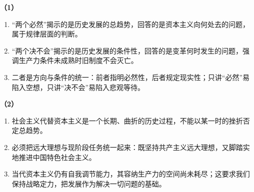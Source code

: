 \textbf{（1）}
\begin{enumerate}[label=(\arabic*),leftmargin=2.2em,itemsep=2pt,topsep=2pt]
\item “两个必然”揭示的是历史发展的总趋势，回答的是资本主义向何处去的问题，属于规律层面的判断。
\item “两个决不会”揭示的是历史发展的条件性，回答的是变革何时发生的问题，强调生产力条件未成熟时旧制度不会灭亡。
\item 二者是方向与条件的统一：前者指明必然性，后者规定现实性；只讲“必然”易陷入空想，只讲“决不会”易陷入悲观等待。
\end{enumerate}

\textbf{（2）}
\begin{enumerate}[label=(\arabic*),leftmargin=2.2em,itemsep=2pt,topsep=2pt]
\item 社会主义代替资本主义是一个长期、曲折的历史过程，不能以某一时的挫折否定总趋势。
\item 必须把远大理想与现阶段任务统一起来：既坚持共产主义远大理想，又脚踏实地推进中国特色社会主义。
\item 当代资本主义仍有自我调节能力，其容纳生产力的空间尚未耗尽；这要求我们保持战略定力，把发展作为解决一切问题的基础。
\end{enumerate}

